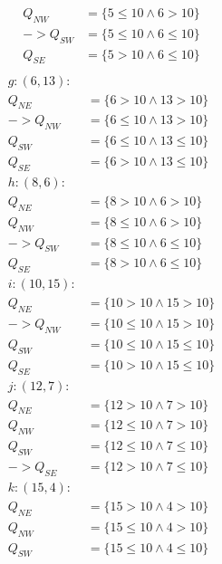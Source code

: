 \documentclass{report}
\begin{document}
\begin{multicols}{2}
\begin{equation*}
\begin{split}
             Q_{NW} & = \{5 \leq 10 \land 6 > 10\} \\
             ->Q_{SW} & = \{5 \leq 10 \land 6 \leq 10\} \\
             Q_{SE} & = \{5 > 10 \land 6 \leq 10\} \\
      \end{split}
    \end{equation*}\break
      \begin{equation*}
        \begin{split}
          g : (6, 13) : \\
             Q_{NE} & = \{6 > 10 \land 13 > 10\} \\
             ->Q_{NW} & = \{6 \leq 10 \land 13 > 10\} \\
             Q_{SW} & = \{6 \leq 10 \land 13 \leq 10\} \\
             Q_{SE} & = \{6 > 10 \land 13 \leq 10\} \\
          h : (8, 6) : \\
             Q_{NE} & = \{8 > 10 \land 6 > 10\} \\
             Q_{NW} & = \{8 \leq 10 \land 6 > 10\} \\
             ->Q_{SW} & = \{8 \leq 10 \land 6 \leq 10\} \\
             Q_{SE} & = \{8 > 10 \land 6 \leq 10\} \\
          i : (10, 15) : \\
             Q_{NE} & = \{10 > 10 \land 15 > 10\} \\
             ->Q_{NW} & = \{10 \leq 10 \land 15 > 10\} \\
             Q_{SW} & = \{10 \leq 10 \land 15 \leq 10\} \\
             Q_{SE} & = \{10 > 10 \land 15 \leq 10\} \\
          j : (12, 7) : \\
             Q_{NE} & = \{12 > 10 \land 7 > 10\} \\
             Q_{NW} & = \{12 \leq 10 \land 7 > 10\} \\
             Q_{SW} & = \{12 \leq 10 \land 7 \leq 10\} \\
             ->Q_{SE} & = \{12 > 10 \land 7 \leq 10\} \\
          k : (15, 4) : \\
             Q_{NE} & = \{15 > 10 \land 4 > 10\} \\
             Q_{NW} & = \{15 \leq 10 \land 4 > 10\} \\
             Q_{SW} & = \{15 \leq 10 \land 4 \leq 10\} \\

\end{split}
\end{equation*}
\end{multicols}
\end{document}
